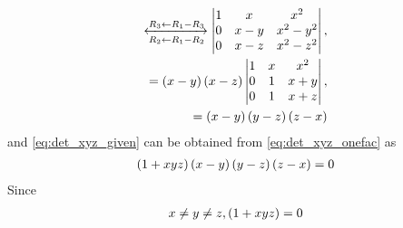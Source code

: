 \documentclass[journal,12pt,twocolumn]{IEEEtran}
\renewcommand\thesection{\arabic{section}}
\begin{document}
\begin{enumerate}[label=\thesection.\arabic*.,ref=\thesection.\theenumi]
\begin{align}
	\\
\xleftrightarrow[R_2 \leftarrow R_1 -R_2]{R_3 \leftarrow R_1 -R_3}
	\begin{vmatrix}1 & x & x^2 \\ 0 & x-y & x^2-y^2 \\ 0 & x-z & x^2-z^2\end{vmatrix}, 
	\\
	=
	\left(x-y\right)	\left(x-z\right)\begin{vmatrix}1 & x & x^2 \\ 0 & 1 & x+y \\ 0 & 1 & x+z\end{vmatrix}, 
	\\
	=
	\left(x-y\right)\left(y-z\right)	\left(z-x\right)
    \end{align}
	and \eqref{eq:det_xyz_given} can be obtained from 
	\eqref{eq:det_xyz_onefac} as
\begin{align}
	\left(1+xyz\right)
	\left(x-y\right)\left(y-z\right)	\left(z-x\right) = 0
    \end{align}
    Since 
\begin{align}
	x \ne y \ne z, 
	\left(1+xyz\right) = 0
    \end{align}
\end{enumerate}
\end{document}
